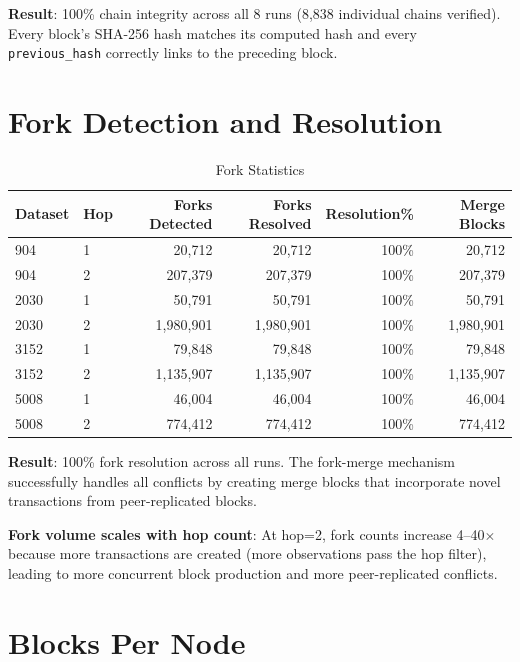 \documentclass[11pt,a4paper]{article}
\begin{document}
\textbf{Result}: 100\% chain integrity across all 8 runs (8,838 individual chains verified).
Every block's SHA-256 hash matches its computed hash and every \texttt{previous\_hash}
correctly links to the preceding block.

\section{Fork Detection and Resolution}

\begin{table}[H]
\centering
\caption{Fork Statistics}
\begin{tabular}{llrrrr}
\toprule
\textbf{Dataset} & \textbf{Hop} & \textbf{Forks Detected} & \textbf{Forks Resolved} & \textbf{Resolution\%} & \textbf{Merge Blocks} \\
\midrule
904   & 1 & 20,712    & 20,712    & 100\% & 20,712 \\
904   & 2 & 207,379   & 207,379   & 100\% & 207,379 \\
2030  & 1 & 50,791    & 50,791    & 100\% & 50,791 \\
2030  & 2 & 1,980,901 & 1,980,901 & 100\% & 1,980,901 \\
3152  & 1 & 79,848    & 79,848    & 100\% & 79,848 \\
3152  & 2 & 1,135,907 & 1,135,907 & 100\% & 1,135,907 \\
5008  & 1 & 46,004    & 46,004    & 100\% & 46,004 \\
5008  & 2 & 774,412   & 774,412   & 100\% & 774,412 \\
\bottomrule
\end{tabular}
\end{table}

\textbf{Result}: 100\% fork resolution across all runs. The fork-merge mechanism
successfully handles all conflicts by creating merge blocks that incorporate novel
transactions from peer-replicated blocks.

\textbf{Fork volume scales with hop count}: At hop=2, fork counts increase 4--40$\times$
because more transactions are created (more observations pass the hop filter),
leading to more concurrent block production and more peer-replicated conflicts.

\section{Blocks Per Node}
\end{document}
